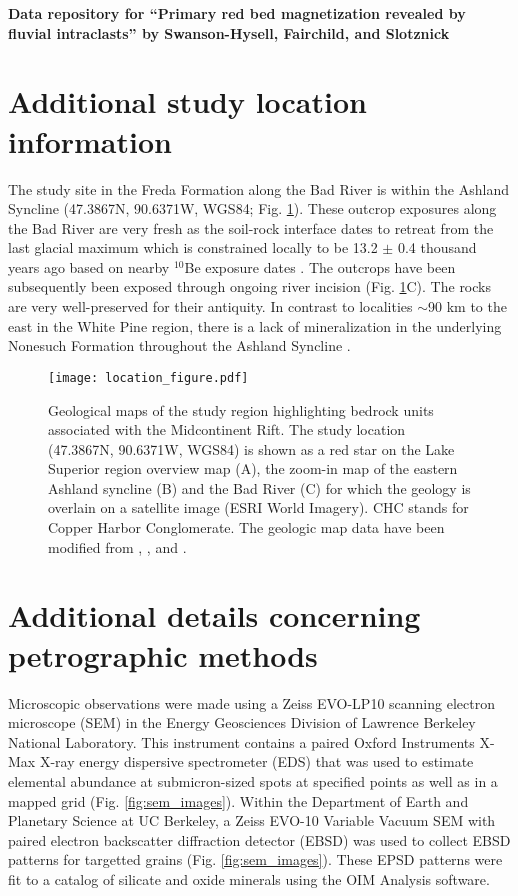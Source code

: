 \documentclass[11pt,letterpaper]{article}
\begin{document}
\begin{flushleft}
{\Large \textbf{Data repository for ``Primary red bed magnetization revealed by fluvial intraclasts'' by Swanson-Hysell, Fairchild, and Slotznick}}

\end{flushleft}

\section*{Additional study location information}
The study site in the Freda Formation along the Bad River is within the Ashland Syncline (47.3867\textdegree N, 90.6371\textdegree W, WGS84; Fig. \ref{fig:location_figure}). These outcrop exposures along the Bad River are very fresh as the soil-rock interface dates to retreat from the last glacial maximum which is constrained locally to be 13.2 $\pm$ 0.4 thousand years ago based on nearby $^{10}$Be exposure dates \citep{Ullman2015a}. The outcrops have been subsequently been exposed through ongoing river incision (Fig. \ref{fig:location_figure}C). The rocks are very well-preserved for their antiquity. In contrast to localities $\sim$90 km to the east in the White Pine region, there is a lack of mineralization in the underlying Nonesuch Formation throughout the Ashland Syncline \citep{Stewart2017a}. 

\begin{figure}[!ht]
\noindent\texttt{[image: location\_figure.pdf]}
\caption{\small{Geological maps of the study region highlighting bedrock units associated with the Midcontinent Rift. The study location (47.3867\textdegree N, 90.6371\textdegree W, WGS84) is shown as a red star on the Lake Superior region overview map (A), the zoom-in map of the eastern Ashland syncline (B) and the Bad River (C) for which the geology is overlain on a satellite image (ESRI World Imagery). CHC stands for Copper Harbor Conglomerate. The geologic map data have been modified from \cite{Survey2011a}, \cite{Nicholson2004a}, and \cite{Jirsa2011a}.}}
\label{fig:location_figure}
\end{figure} 

\section*{Additional details concerning petrographic methods}
Microscopic observations were made using a Zeiss EVO-LP10 scanning electron microscope (SEM) in the Energy Geosciences Division of Lawrence Berkeley National Laboratory. This instrument contains a paired Oxford Instruments X-Max X-ray energy dispersive spectrometer (EDS) that was used to estimate elemental abundance at submicron-sized spots at specified points as well as in a mapped grid (Fig. \ref{fig:sem_images}). Within the Department of Earth and Planetary Science at UC Berkeley, a Zeiss EVO-10 Variable Vacuum SEM with paired electron backscatter diffraction detector (EBSD) was used to collect EBSD patterns for targetted grains (Fig. \ref{fig:sem_images}). These EPSD patterns were fit to a catalog of silicate and oxide minerals using the OIM Analysis software.
\end{document}
